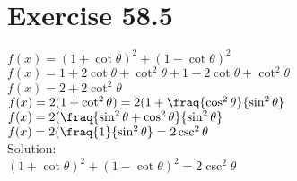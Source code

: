 \documentclass[a4paper, 10pt]{scrartcl}
\begin{document}
\section{Exercise 58.5}

$f(x) = (1 + \cot{\theta})^{2} + (1 - \cot{\theta})^{2}$\\
$f(x) = 1 + 2\cot{\theta} + \cot^{2}{\theta} + 1 - 2\cot{\theta} + \cot^{2}{\theta}$\\
$f(x) = 2 + 2\cot^{2}{\theta}$\\
$f(x) = 2(1 + \cot^{2}{\theta}) = 2(1 + \fraq{\cos^{2}{\theta}}{\sin^{2}{\theta}}$\\
$f(x) = 2(\fraq{\sin^{2}{\theta} + \cos^{2}{\theta}}{\sin^{2}{\theta}}$\\
$f(x) = 2(\fraq{1}{\sin^{2}{\theta}} = 2\csc^{2}{\theta}$\\

Solution:\\
$(1 + \cot{\theta})^{2} + (1 - \cot{\theta})^{2} = 2\csc^{2}{\theta}$
\end{document}
